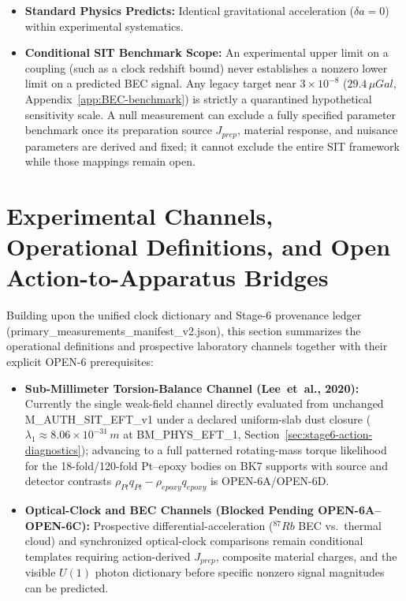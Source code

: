 \documentclass[american,11pt,letterpaper]{article}
\def\mathrm#1{#1}%
\def\texttt#1{#1}%
\def\emph#1{#1}%
\begin{document}
\begin{itemize}
    \item \textbf{Standard Physics Predicts:} Identical gravitational acceleration ($\delta a = 0$) within experimental systematics.
    \item \textbf{Conditional SIT Benchmark Scope:} An experimental upper limit on a coupling (such as a clock redshift bound) never establishes a nonzero lower limit on a predicted BEC signal. Any legacy target near $3\times 10^{-8}$ ($29.4\,\mu\mathrm{Gal}$, Appendix~\ref{app:BEC-benchmark}) is strictly a quarantined hypothetical sensitivity scale. A null measurement can exclude a \emph{fully specified parameter benchmark} once its preparation source $J_{\mathrm{prep}}$, material response, and nuisance parameters are derived and fixed; it cannot exclude the entire SIT framework while those mappings remain open.
\end{itemize}

\section{Experimental Channels, Operational Definitions, and Open Action-to-Apparatus Bridges}
\label{sec:experimental-predictions}
\label{sec:experimental-predictions-falsifiability}

Building upon the unified clock dictionary and Stage-6 provenance ledger (\texttt{primary\_measurements\_manifest\_v2.json}), this section summarizes the operational definitions and prospective laboratory channels together with their explicit \texttt{OPEN-6} prerequisites:

\begin{itemize}
    \item \textbf{Sub-Millimeter Torsion-Balance Channel (Lee~\emph{et~al.}, 2020):} Currently the single weak-field channel directly evaluated from unchanged \texttt{M\_AUTH\_SIT\_EFT\_v1} under a declared uniform-slab dust closure ($\lambda_1 \approx 8.06\times 10^{-31}\,\mathrm{m}$ at \texttt{BM\_PHYS\_EFT\_1}, Section~\ref{sec:stage6-action-diagnostics}); advancing to a full patterned rotating-mass torque likelihood for the 18-fold/120-fold Pt--epoxy bodies on BK7 supports with source and detector contrasts $\rho_{\mathrm{Pt}} q_{\mathrm{Pt}} - \rho_{\mathrm{epoxy}} q_{\mathrm{epoxy}}$ is \texttt{OPEN-6A}/\texttt{OPEN-6D}.

    \item \textbf{Optical-Clock and BEC Channels (Blocked Pending \texttt{OPEN-6A}--\texttt{OPEN-6C}):} Prospective differential-acceleration ($^{87}\mathrm{Rb}$ BEC vs.\ thermal cloud) and synchronized optical-clock comparisons remain conditional templates requiring action-derived $J_{\mathrm{prep}}$, composite material charges, and the visible $U(1)$ photon dictionary before specific nonzero signal magnitudes can be predicted.
\end{itemize}
\end{document}
